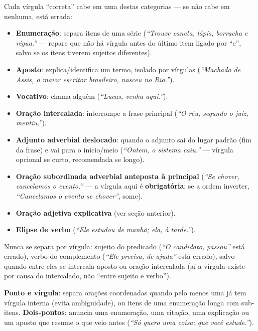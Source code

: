 \begin{conceito}
Cada vírgula “correta” cabe em uma destas categorias --- se não cabe em
nenhuma, está errada:

\begin{itemize}
\item \textbf{Enumeração}: separa itens de uma série (\textit{“Trouxe
caneta, lápis, borracha e régua.”} --- repare que não há vírgula antes do
último item ligado por “e”, salvo se os itens tiverem sujeitos diferentes).
\item \textbf{Aposto}: explica/identifica um termo, isolado por vírgulas
(\textit{“Machado de Assis, o maior escritor brasileiro, nasceu no Rio.”}).
\item \textbf{Vocativo}: chama alguém (\textit{“Lucas, venha aqui.”}).
\item \textbf{Oração intercalada}: interrompe a frase principal
(\textit{“O réu, segundo o juiz, mentiu.”}).
\item \textbf{Adjunto adverbial deslocado}: quando o adjunto sai do lugar
padrão (fim da frase) e vai para o início/meio (\textit{“Ontem, o sistema
caiu.”} --- vírgula opcional se curto, recomendada se longo).
\item \textbf{Oração subordinada adverbial anteposta à principal}
(\textit{“Se chover, cancelamos o evento.”} --- a vírgula aqui é
\textbf{obrigatória}; se a ordem inverter, \textit{“Cancelamos o evento se
chover”}, some).
\item \textbf{Oração adjetiva explicativa} (ver seção anterior).
\item \textbf{Elipse de verbo} (\textit{“Ele estudou de manhã; ela, à
tarde.”}).
\end{itemize}
\end{conceito}

\begin{cuidado}
Nunca se separa por vírgula: sujeito do predicado (\textit{“O candidato,
passou”} está errado), verbo do complemento (\textit{“Ele precisa, de
ajuda”} está errado), salvo quando entre eles se intercala aposto ou oração
intercalada (aí a vírgula existe por causa do intercalado, não “entre sujeito
e verbo”).
\end{cuidado}

\begin{conceito}
\textbf{Ponto e vírgula}: separa orações coordenadas quando pelo menos uma já
tem vírgula interna (evita ambiguidade), ou itens de uma enumeração longa
com sub-itens. \textbf{Dois-pontos}: anuncia uma enumeração, uma citação, uma
explicação ou um aposto que resume o que veio antes (\textit{“Só quero uma
coisa: que você estude.”}).
\end{conceito}

